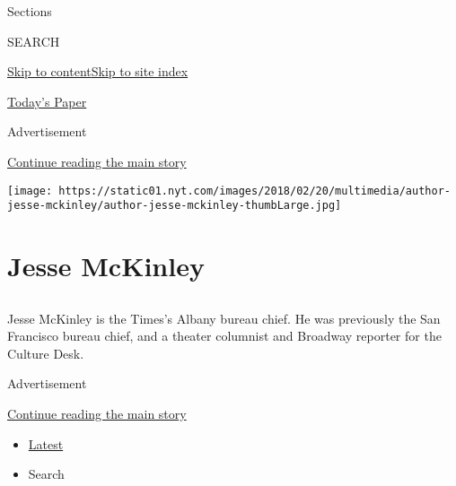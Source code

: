Sections

SEARCH

\protect\hyperlink{site-content}{Skip to
content}\protect\hyperlink{site-index}{Skip to site index}

\href{https://myaccount.nytimes.com/auth/login?response_type=cookie\&client_id=vi}{}

\href{https://www.nytimes.com/section/todayspaper}{Today's Paper}

Advertisement

\protect\hyperlink{after-top}{Continue reading the main story}

\texttt{[image: https://static01.nyt.com/images/2018/02/20/multimedia/author-jesse-mckinley/author-jesse-mckinley-thumbLarge.jpg]}

\hypertarget{jesse-mckinley}{%
\section{Jesse McKinley}\label{jesse-mckinley}}

\subsection{}

Jesse McKinley is the Times's Albany bureau chief. He was previously the
San Francisco bureau chief, and a theater columnist and Broadway
reporter for the Culture Desk.

Advertisement

\protect\hyperlink{after-mid1}{Continue reading the main story}

\begin{itemize}
\tightlist
\item
  \protect\hyperlink{stream-panel}{Latest}
\item
  Search
\end{itemize}

